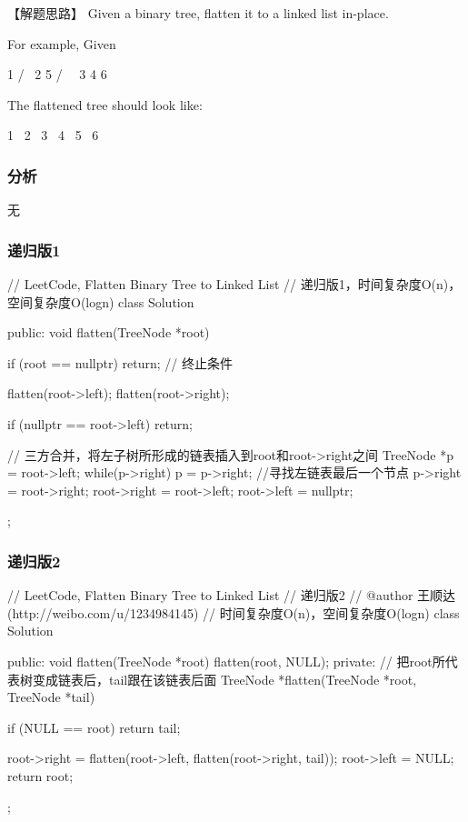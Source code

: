 【解题思路】
Given a binary tree, flatten it to a linked list in-place.

For example, Given
\begin{Code}
	1
	/ \
	2   5
	/ \   \
	3   4   6
\end{Code}

The flattened tree should look like:
\begin{Code}
	1
	\
	2
	\
	3
	\
	4
	\
	5
	\
	6
\end{Code}

\subsubsection{分析}
无


\subsubsection{递归版1}
\begin{Code}
	// LeetCode, Flatten Binary Tree to Linked List
	// 递归版1，时间复杂度O(n)，空间复杂度O(logn)
	class Solution {
		public:
		void flatten(TreeNode *root) {
			if (root == nullptr) return;  // 终止条件
			
			flatten(root->left);
			flatten(root->right);
			
			if (nullptr == root->left) return;
			
			// 三方合并，将左子树所形成的链表插入到root和root->right之间
			TreeNode *p = root->left;
			while(p->right) p = p->right; //寻找左链表最后一个节点
			p->right = root->right;
			root->right = root->left;
			root->left = nullptr;
		}
	};
\end{Code}


\subsubsection{递归版2}
\begin{Code}
	// LeetCode, Flatten Binary Tree to Linked List
	// 递归版2
	// @author 王顺达(http://weibo.com/u/1234984145)
	// 时间复杂度O(n)，空间复杂度O(logn)
	class Solution {
		public:
		void flatten(TreeNode *root) {
			flatten(root, NULL);
		}
		private:
		// 把root所代表树变成链表后，tail跟在该链表后面
		TreeNode *flatten(TreeNode *root, TreeNode *tail) {
			if (NULL == root) return tail;
			
			root->right = flatten(root->left, flatten(root->right, tail));
			root->left = NULL;
			return root;
		}
	};
\end{Code}


